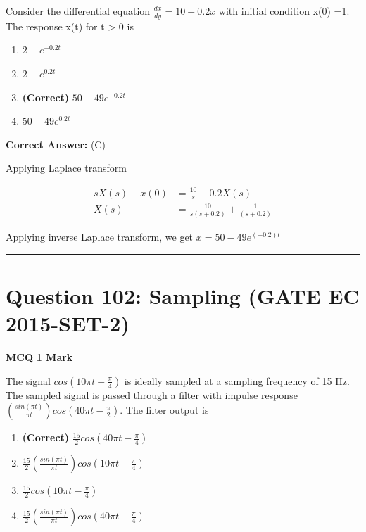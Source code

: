 \documentclass[11pt,a4paper]{article}
\begin{document}
\noindent Consider the differential equation $\frac{dx}{dy}=10-0.2x$ with initial condition x(0) =1. The response x(t) for t > 0 is


\begin{enumerate}[label=(\Alph*)]
    \item $2-e^{-0.2t}$
    \item $2-e^{0.2t}$
    \item \textbf{(Correct)} $50-49e^{-0.2t}$
    \item $50-49e^{0.2t}$
\end{enumerate}

\noindent \textbf{Correct Answer:} (C)

\begin{tcolorbox}[solbox, title=Detailed Solution -- Question 101]
Applying Laplace transform

\[
\begin{aligned} s X(s)-x(0) &=\frac{10}{s}-0.2 X(s) \\ X(s) &=\frac{10}{s(s+0.2)}+\frac{1}{(s+0.2)} \end{aligned}
\]

 Applying inverse Laplace transform, we get
$x=50-49 e^{(-0.2) t}$
\end{tcolorbox}

\vspace{1.5em}
\hrule
\vspace{1.5em}

\section*{Question 102: Sampling (GATE EC 2015-SET-2)}
\noindent \textbf{\color{primary}MCQ} \hfill \textbf{\color{secondary}1 Mark}


\noindent The signal $cos(10\pi t+\frac{\pi }{4})$ is ideally sampled at a sampling frequency of 15 Hz. The sampled signal is passed through a filter with impulse response $(\frac{sin(\pi t)}{\pi t})cos(40\pi t-\frac{\pi }{2})$. The filter output is


\begin{enumerate}[label=(\Alph*)]
    \item \textbf{(Correct)} $\frac{15}{2}cos(40\pi t-\frac{\pi }{4})$
    \item $\frac{15}{2}(\frac{sin(\pi t)}{\pi t})cos(10\pi t+\frac{\pi }{4})$
    \item $\frac{15}{2}cos(10\pi t-\frac{\pi }{4})$
    \item $\frac{15}{2}(\frac{sin(\pi t)}{\pi t})cos(40\pi t-\frac{\pi }{4})$
\end{enumerate}
\end{document}

